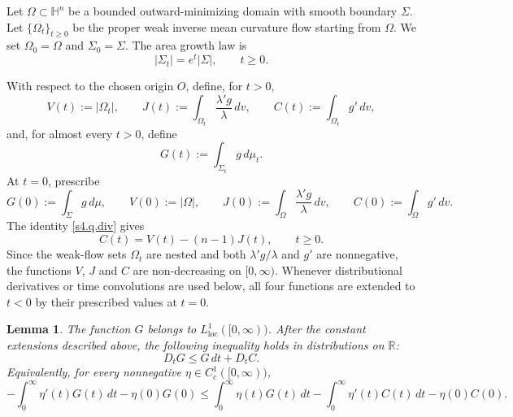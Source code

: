 \documentclass[10pt,a4paper]{amsart}
\numberwithin{equation}{section}
\newtheorem{lemma}[theorem]{Lemma}
\newcommand{\HH}{\mathbb H}
\begin{document}
Let $\Omega\subset\HH^n$ be a bounded outward-minimizing domain with smooth boundary $\Sigma$.  Let $\{\Omega_t\}_{t\geq0}$ be the proper weak inverse mean curvature flow starting from $\Omega$.  We set $\Omega_0=\Omega$ and $\Sigma_0=\Sigma$.  The area growth law is
\begin{equation*}
    |\Sigma_t|=e^t|\Sigma|,
    \qquad t\geq0.
\end{equation*}

With respect to the chosen origin $O$, define, for $t>0$,
\begin{equation*}
    V(t):=|\Omega_t|,\qquad
    J(t):=\int_{\Omega_t}\frac{\lambda'g}{\lambda}\,dv,\qquad
    C(t):=\int_{\Omega_t}g'\,dv,
\end{equation*}
and, for almost every $t>0$, define
\begin{equation*}
    G(t):=\int_{\Sigma_t}g\,d\mu_t.
\end{equation*}
At $t=0$, prescribe
\begin{equation*}
    G(0):=\int_\Sigma g\,d\mu,\qquad
    V(0):=|\Omega|,\qquad
    J(0):=\int_\Omega\frac{\lambda'g}{\lambda}\,dv,\qquad
    C(0):=\int_\Omega g'\,dv.
\end{equation*}
The identity \eqref{s4.q.div} gives
\begin{equation*}
    C(t)=V(t)-(n-1)J(t),
    \qquad t\geq0.
\end{equation*}
Since the weak-flow sets $\Omega_t$ are nested and both
$\lambda'g/\lambda$ and $g'$ are nonnegative, the functions
$V$, $J$ and $C$ are non-decreasing on $[0,\infty)$. Whenever
distributional derivatives or time convolutions are used below, all four functions are extended to $t<0$ by their prescribed values at $t=0$.

\begin{lemma}\label{lem:hyp-weak-transport-G}
The function $G$ belongs to $L^1_{\mathrm{loc}}([0,\infty))$.  After the constant extensions described above, the following inequality holds in distributions on $\mathbb R$:
\begin{equation}\label{eq:hyp-measure-transport}
    D_tG\leq G\,dt+D_tC.
\end{equation}
Equivalently, for every nonnegative $\eta\in C_c^1([0,\infty))$,
\begin{equation}\label{eq:hyp-transport-test}
    -\int_0^\infty\eta'(t)G(t)\,dt-\eta(0)G(0)
    \leq
    \int_0^\infty\eta(t)G(t)\,dt
    -\int_0^\infty\eta'(t)C(t)\,dt-\eta(0)C(0).
\end{equation}
\end{lemma}
\end{document}
